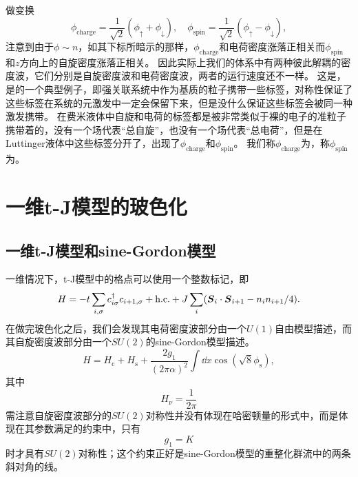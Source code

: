 做变换
\begin{equation}
    \phi_{\text{charge}} = \frac{1}{\sqrt{2}} (\phi_\uparrow + \phi_\downarrow), \quad \phi_{\text{spin}} = \frac{1}{\sqrt{2}} (\phi_\uparrow - \phi_\downarrow),
\end{equation}
注意到由于$\phi \sim n$，如其下标所暗示的那样，$\phi_\text{charge}$和电荷密度涨落正相关而$\phi_\text{spin}$和$z$方向上的自旋密度涨落正相关。
因此实际上我们的体系中有两种彼此解耦的密度波，它们分别是自旋密度波和电荷密度波，两者的运行速度还不一样。
这是，是的一个典型例子，即强关联系统中作为基质的粒子携带一些标签，对称性保证了这些标签在系统的元激发中一定会保留下来，但是没什么保证这些标签会被同一种激发携带。
在费米液体中自旋和电荷的标签都是被非常类似于裸的电子的准粒子携带着的，没有一个场代表“总自旋”，也没有一个场代表“总电荷”，但是在Luttinger液体中这些标签分开了，出现了$\phi_\text{charge}$和$\phi_\text{spin}$。
我们称$\phi_\text{charge}$为，称$\phi_\text{spin}$为。

\section{一维t-J模型的玻色化}

\subsection{一维t-J模型和sine-Gordon模型}

一维情况下，t-J模型中的格点可以使用一个整数标记，即
\begin{equation}
    H = - t \sum_{i, \sigma} c_{i \sigma}^\dagger c_{i+1, \sigma} + \text{h.c.} + J \sum_i (\vb*{S}_i \cdot \vb*{S}_{i+1} - n_i n_{i+1} / 4).
\end{equation}
在做完玻色化之后，我们会发现其电荷密度波部分由一个$U(1)$自由模型描述，而其自旋密度波部分由一个$SU(2)$的sine-Gordon模型描述。
\begin{equation}
    H = H_\text{c} + H_\text{s} + \frac{2g_1}{(2\pi \alpha)^2} \int \dd{x} \cos(\sqrt{8} \phi_\text{s}),
\end{equation}
其中
\begin{equation}
    H_\nu = \frac{1}{2\pi}
\end{equation}
需注意自旋密度波部分的$SU(2)$对称性并没有体现在哈密顿量的形式中，而是体现在其参数满足的约束中，只有
\begin{equation}
    g_1 = K
\end{equation}
时才具有$SU(2)$对称性；这个约束正好是sine-Gordon模型的重整化群流中的两条斜对角的线。

